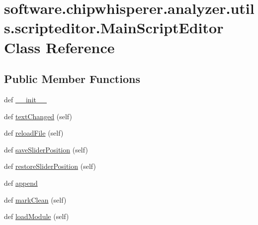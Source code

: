 \hypertarget{classsoftware_1_1chipwhisperer_1_1analyzer_1_1utils_1_1scripteditor_1_1MainScriptEditor}{}\section{software.\+chipwhisperer.\+analyzer.\+utils.\+scripteditor.\+Main\+Script\+Editor Class Reference}
\label{classsoftware_1_1chipwhisperer_1_1analyzer_1_1utils_1_1scripteditor_1_1MainScriptEditor}
\subsection*{Public Member Functions}
\begin{DoxyCompactItemize}
\item 
def \hyperlink{classsoftware_1_1chipwhisperer_1_1analyzer_1_1utils_1_1scripteditor_1_1MainScriptEditor_a6096a6e67e8c6f17063d7ff8a762936f}{\+\_\+\+\_\+init\+\_\+\+\_\+}
\item 
def \hyperlink{classsoftware_1_1chipwhisperer_1_1analyzer_1_1utils_1_1scripteditor_1_1MainScriptEditor_a4df63aab22eb44eafb81ba8de29c7bd4}{text\+Changed} (self)
\item 
def \hyperlink{classsoftware_1_1chipwhisperer_1_1analyzer_1_1utils_1_1scripteditor_1_1MainScriptEditor_adde1ee78719417deaf23c0abcf3c42c3}{reload\+File} (self)
\item 
def \hyperlink{classsoftware_1_1chipwhisperer_1_1analyzer_1_1utils_1_1scripteditor_1_1MainScriptEditor_afee005fa2b8fcdef51d4f65a92341c57}{save\+Slider\+Position} (self)
\item 
def \hyperlink{classsoftware_1_1chipwhisperer_1_1analyzer_1_1utils_1_1scripteditor_1_1MainScriptEditor_a132cd1d75d98632993a2da5d8c47d5a4}{restore\+Slider\+Position} (self)
\item 
def \hyperlink{classsoftware_1_1chipwhisperer_1_1analyzer_1_1utils_1_1scripteditor_1_1MainScriptEditor_a082057d96ea6fcdc4334024594ea5c6f}{append}
\item 
def \hyperlink{classsoftware_1_1chipwhisperer_1_1analyzer_1_1utils_1_1scripteditor_1_1MainScriptEditor_af1289d27a909c61f77eb968e9eabed73}{mark\+Clean} (self)
\item 
def \hyperlink{classsoftware_1_1chipwhisperer_1_1analyzer_1_1utils_1_1scripteditor_1_1MainScriptEditor_a306c7b2ca41d192a0a2c79914d7f0640}{load\+Module} (self)
\end{DoxyCompactItemize}
